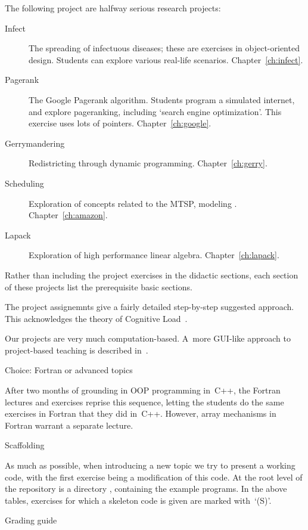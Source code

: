 The following project are halfway serious research projects:

\begin{description}
\item[Infect] The spreading of infectuous diseases; these are
  exercises in object-oriented design. Students can explore various
  real-life scenarios. Chapter~\ref{ch:infect}.
\item[Pagerank] The Google Pagerank algorithm. Students program a
  simulated internet, and explore pageranking, including `search
  engine optimization'. This exercise uses lots of
  pointers. Chapter~\ref{ch:google}.
\item[Gerrymandering] Redistricting through dynamic programming.
  Chapter~\ref{ch:gerry}.
\item[Scheduling] Exploration of concepts related to the
  \ac{MTSP}, modeling .
  Chapter~\ref{ch:amazon}.
\item[Lapack] Exploration of high performance linear algebra.
  Chapter~\ref{ch:lapack}.
\end{description}

Rather than including the project exercises in the didactic sections,
each section of these projects list the prerequisite basic sections.

The project assignemnts give a fairly detailed step-by-step suggested
approach. This acknowledges the theory of Cognitive
Load~\cite{Ericson:parsons2017}.

Our projects are very much computation-based. A~more GUI-like approach
to project-based teaching is described
in~\cite{Chen:2012:project-cpp}.

 {Choice: Fortran or advanced topics}

After two months of grounding in OOP programming in~C++, the Fortran
lectures and exercises reprise this sequence, letting the students do
the same exercises in Fortran that they did in~C++.  However, array
mechanisms in Fortran warrant a separate lecture.

 {Scaffolding}

As much as possible, when introducing a new topic
we try to present a working code,
with the first exercise being a modification of this code.
At the root level of the repository is a directory ,
containing the example programs.
In the above tables,
exercises for which a skeleton code is given
are marked with~`(S)'.

 {Grading guide}

